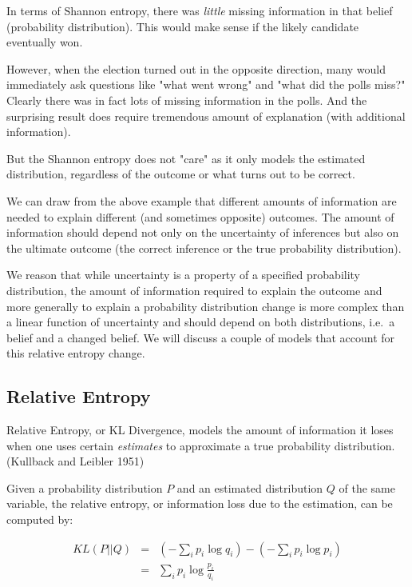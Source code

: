 \documentclass[
  letterpaper,
]{scrbook}
\begin{document}
In terms of Shannon entropy, there was \emph{little} missing information
in that belief (probability distribution). This would make sense if the
likely candidate eventually won.

However, when the election turned out in the opposite direction, many
would immediately ask questions like "what went wrong" and "what did the
polls miss?" Clearly there was in fact lots of missing information in
the polls. And the surprising result does require tremendous amount of
explanation (with additional information).

But the Shannon entropy does not "care" as it only models the estimated
distribution, regardless of the outcome or what turns out to be correct.

We can draw from the above example that different amounts of information
are needed to explain different (and sometimes opposite) outcomes. The
amount of information should depend not only on the uncertainty of
inferences but also on the ultimate outcome (the correct inference or
the true probability distribution).

We reason that while uncertainty is a property of a specified
probability distribution, the amount of information required to explain
the outcome and more generally to explain a probability distribution
change is more complex than a linear function of uncertainty and should
depend on both distributions, i.e.~a belief and a changed belief. We
will discuss a couple of models that account for this relative entropy
change.

\subsection{Relative Entropy}\label{relative-entropy}

Relative Entropy, or KL Divergence, models the amount of information it
loses when one uses certain \emph{estimates} to approximate a true
probability distribution.(Kullback and Leibler 1951)

Given a probability distribution \(P\) and an estimated distribution
\(Q\) of the same variable, the relative entropy, or information loss
due to the estimation, can be computed by:

\[\begin{aligned}
  KL(P||Q)
  & = & (- \sum_i p_i \log q_i) - (- \sum_i p_i \log p_i) \\
  & = & \sum_i p_i \log \frac{p_i}{q_i}
\end{aligned}\]
\end{document}
